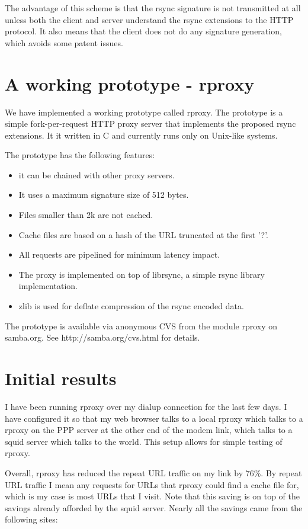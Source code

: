 \documentclass[a4paper]{article}
\begin{document}
The advantage of this scheme is that the rsync signature is not
transmitted at all unless both the client and server understand the
rsync extensions to the HTTP protocol. It also means that the client
does not do any signature generation, which avoids some patent issues.

\section*{A working prototype - rproxy}

We have implemented a working prototype called rproxy. The prototype
is a simple fork-per-request HTTP proxy server that implements the
proposed rsync extensions. It it written in C and currently runs only
on Unix-like systems.

The prototype has the following features:

\begin{itemize}
\item it can be chained with other proxy servers.
\item It uses a maximum signature size of 512 bytes. 
\item Files smaller than 2k are not cached.
\item Cache files are based on a hash of the URL truncated at the
  first '?'.
\item All requests are pipelined for minimum latency impact.
\item The proxy is implemented on top of librsync, a simple rsync
  library implementation.
\item zlib is used for deflate compression of the rsync encoded data.
\end{itemize}

The prototype is available via anonymous CVS from the module rproxy on
samba.org. See http://samba.org/cvs.html for details.

\section*{Initial results}

I have been running rproxy over my dialup connection for the last few
days. I have configured it so that my web browser talks to a local
rproxy which talks to a rproxy on the PPP server at the other end of
the modem link, which talks to a squid server which talks to the
world. This setup allows for simple testing of rproxy.

Overall, rproxy has reduced the repeat URL traffic on my link by 76\%.
By repeat URL traffic I mean any requests for URLs that rproxy could
find a cache file for, which is my case is most URLs that I visit.
Note that this saving is on top of the savings already afforded by the
squid server. Nearly all the savings came from the following sites:
\end{document}
